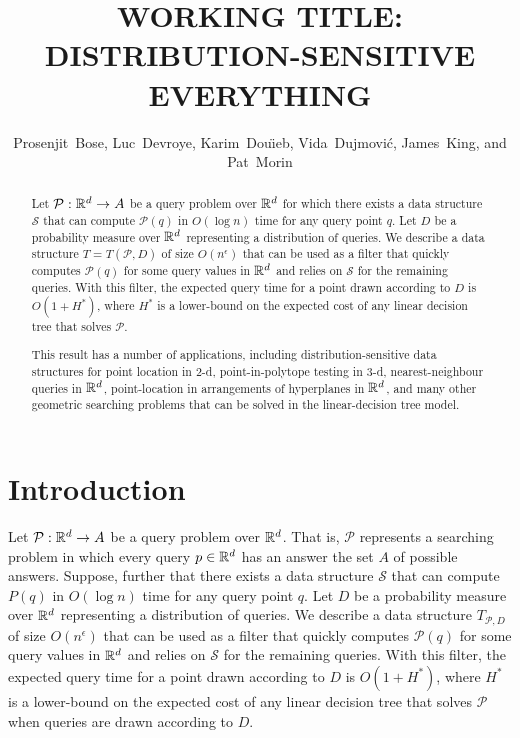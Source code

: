 \documentclass{patmorin}
\title{\MakeUppercase{Working Title: Distribution-Sensitive Everything}}
\author{Prosenjit~Bose, 
        Luc~Devroye,
	Karim~Dou\"{\i}eb, 
	Vida~Dujmovi\'c, 
	James~King, and 
	Pat~Morin}
\newcommand{\eps}{\epsilon}
\begin{document}
\maketitle

\begin{abstract}
Let $\mathcal{P}:\mathbb{R}^d\rightarrow A$ be a query problem over $\mathbb{R}^d$
for which there exists a data structure $\mathcal{S}$ that can compute
$\mathcal{P}(q)$ in $O(\log n)$ time for any query point $q$.  Let $D$ be
a probability measure over $\mathbb{R}^d$ representing a distribution of queries.
We describe a data structure $T=T(\mathcal{P},D)$ of size $O(n^\eps)$
that can be used as a filter that quickly computes $\mathcal{P}(q)$
for some query values in $\mathbb{R}^d$ and relies on $\mathcal{S}$ for the
remaining queries.  With this filter, the expected query time for a point
drawn according to $D$ is $O(1+ H^*)$, where $H^*$ is a lower-bound on
the expected cost of any linear decision tree that solves $\mathcal{P}$.

This result has a number of applications, including distribution-sensitive
data structures for point location in 2-d, point-in-polytope testing in
3-d, nearest-neighbour queries in $\mathbb{R}^d$, point-location in arrangements
of hyperplanes in $\mathbb{R}^d$, and many other geometric searching problems
that can be solved in the linear-decision tree model.
\end{abstract}

\section{Introduction}

Let $\mathcal{P}:\mathbb{R}^d\rightarrow A$ be a query problem over $\mathbb{R}^d$.
That is, $\mathcal{P}$ represents a searching problem in which every query
$p\in\mathbb{R}^d$ has an answer the set $A$ of possible answers.  Suppose,
further that there exists a data structure $\mathcal{S}$ that can
compute $P(q)$ in $O(\log n)$ time for any query point $q$. Let $D$ be a
probability measure over $\mathbb{R}^d$ representing a distribution of queries.
We describe a data structure $T_{\mathcal{P},D}$ of size $O(n^{\eps})$
that can be used as a filter that quickly computes $\mathcal{P}(q)$
for some query values in $\mathbb{R}^d$ and relies on $\mathcal{S}$ for the
remaining queries.  With this filter, the expected query time for a point
drawn according to $D$ is $O(1+ H^*)$, where $H^*$ is a lower-bound on
the expected cost of any linear decision tree that solves $\mathcal{P}$
when queries are drawn according to $D$.
\end{document}
